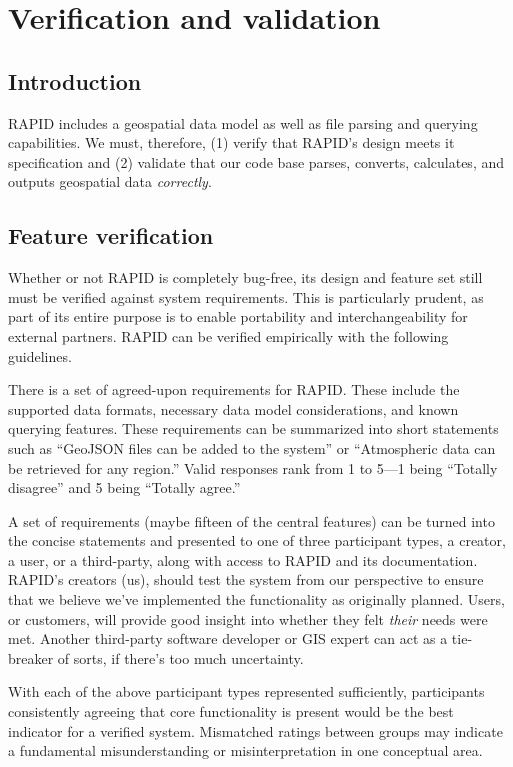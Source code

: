 \chapter{Verification and validation}

\section{Introduction}
RAPID includes a geospatial data model as well as file parsing and querying capabilities. We must, therefore, (1) verify that RAPID's design meets it specification and (2) validate that our code base parses, converts, calculates, and outputs geospatial data \textit{correctly}.

\section{Feature verification}
Whether or not RAPID is completely bug-free, its design and feature set still must be verified against system requirements. This is particularly prudent, as part of its entire purpose is to enable portability and interchangeability for external partners. RAPID can be verified empirically with the following guidelines.

There is a set of agreed-upon requirements for RAPID. These include the supported data formats, necessary data model considerations, and known querying features. These requirements can be summarized into short statements such as ``GeoJSON files can be added to the system'' or ``Atmospheric data can be retrieved for any region.'' Valid responses rank from 1 to 5---1 being ``Totally disagree'' and 5 being ``Totally agree.''

A set of requirements (maybe fifteen of the central features) can be turned into the concise statements and presented to one of three  participant types, a creator, a user, or a third-party, along with access to RAPID and its documentation. RAPID's creators (us), should test the system from our perspective to ensure that we believe we've implemented the functionality as originally planned. Users, or customers, will provide good insight into whether they felt \textit{their} needs were met. Another third-party software developer or GIS expert can act as a tie-breaker of sorts, if there's too much uncertainty.

With each of the above participant types represented sufficiently, participants consistently agreeing that core functionality is present would be the best indicator for a verified system. Mismatched ratings between groups may indicate a fundamental misunderstanding or misinterpretation in one conceptual area.

